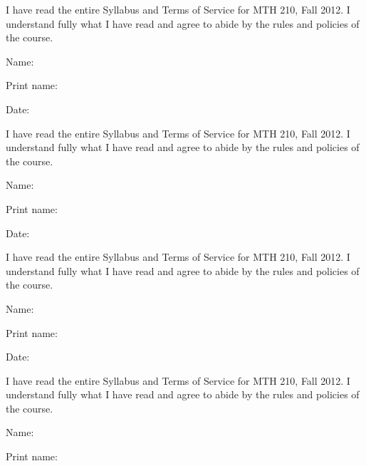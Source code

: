 \documentclass[12pt]{article}
\begin{document}
	
I have read the entire Syllabus and Terms of Service for MTH 210, Fall 2012. I understand fully what I have read and agree to abide by the rules and policies of the course. 

\bigskip

Name: \underline{\hspace{3in}}
\medskip

Print name: \underline{\hspace{3in}}
\medskip

Date: \underline{\hspace{3in}}

\vspace{0.5in}

I have read the entire Syllabus and Terms of Service for MTH 210, Fall 2012. I understand fully what I have read and agree to abide by the rules and policies of the course. 

\bigskip

Name: \underline{\hspace{3in}}
\medskip

Print name: \underline{\hspace{3in}}
\medskip

Date: \underline{\hspace{3in}}	
	

\vspace{0.5in}

I have read the entire Syllabus and Terms of Service for MTH 210, Fall 2012. I understand fully what I have read and agree to abide by the rules and policies of the course. 

\bigskip

Name: \underline{\hspace{3in}}
\medskip

Print name: \underline{\hspace{3in}}
\medskip

Date: \underline{\hspace{3in}}


\vspace{0.5in}

I have read the entire Syllabus and Terms of Service for MTH 210, Fall 2012. I understand fully what I have read and agree to abide by the rules and policies of the course. 

\bigskip

Name: \underline{\hspace{3in}}
\medskip

Print name: \underline{\hspace{3in}}
\medskip
\end{document}
